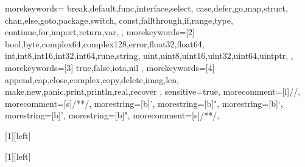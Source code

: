 \usepackage{textcomp, listings, xcolor-material, enumitem, tabularx,amsmath,multirow, latexsym, amssymb}
\usepackage[noend]{algpseudocode}
\usepackage{algorithm, algorithmicx}
\usepackage[hmargin=1.25in, vmargin=1in]{geometry}
\usepackage{hyperref}
\hypersetup{
	colorlinks,%
}

 {
	morekeywords={
		break,default,func,interface,select,
		case,defer,go,map,struct,
		chan,else,goto,package,switch,
		const,fallthrough,if,range,type,
		continue,for,import,return,var,
	},	%
	morekeywords=[2] {
		bool,byte,complex64,complex128,error,float32,float64,
		int,int8,int16,int32,int64,rune,string,
		uint,uint8,uint16,uint32,uint64,uintptr,
	},	%
	morekeywords=[3] {
		true,false,iota,nil
	}, 	%
	morekeywords=[4] {
		append,cap,close,complex,copy,delete,imag,len,
		make,new,panic,print,println,real,recover
	}, %
	sensitive=true,
	morecomment=[l]{//},
	morecomment=[s]{/*}{*/},
	morestring=[b]',
	morestring=[b]",
	morestring=[b]`,
}
 {
	morestring=[b]',
	morestring=[b]",
	morecomment=[s]{/*}{*/},
}




\hypersetup{
	colorlinks=true,
	allcolors=MaterialCyan,
	anchorcolor=MaterialCyan,
	pdfauthor=sanfusu,
	pdfkeywords=golang,
}
\newcommand{\code}{\lstinline}

[1][left]{
\lstset{language=golang, style=golang, numbers=#1}
}{}

[1][left]{
\lstset{language=EBNF, style=EBNF, numbers=#1}
}{}
